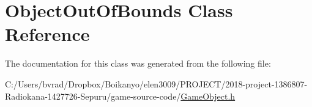 \hypertarget{class_object_out_of_bounds}{}\section{Object\+Out\+Of\+Bounds Class Reference}
\label{class_object_out_of_bounds}


The documentation for this class was generated from the following file\+:\begin{DoxyCompactItemize}
\item 
C\+:/\+Users/bvrad/\+Dropbox/\+Boikanyo/elen3009/\+P\+R\+O\+J\+E\+C\+T/2018-\/project-\/1386807-\/\+Radiokana-\/1427726-\/\+Sepuru/game-\/source-\/code/\mbox{\hyperlink{_game_object_8h}{Game\+Object.\+h}}\end{DoxyCompactItemize}
